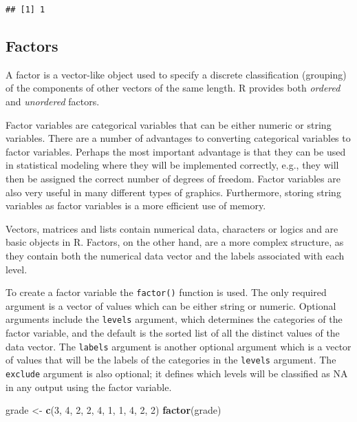 \documentclass[]{book}
\newenvironment{Shaded}{\begin{snugshade}}{\end{snugshade}}
\newcommand{\KeywordTok}[1]{\textcolor[rgb]{0.13,0.29,0.53}{\textbf{{#1}}}}
\newcommand{\DecValTok}[1]{\textcolor[rgb]{0.00,0.00,0.81}{{#1}}}
\newcommand{\StringTok}[1]{\textcolor[rgb]{0.31,0.60,0.02}{{#1}}}
\newcommand{\NormalTok}[1]{{#1}}
\begin{document}
\begin{verbatim}
## [1] 1
\end{verbatim}

\subsection{Factors}\label{factors}

A factor is a vector-like object used to specify a discrete
classification (grouping) of the components of other vectors of the same
length. R provides both \emph{ordered} and \emph{unordered} factors.

Factor variables are categorical variables that can be either numeric or
string variables. There are a number of advantages to converting
categorical variables to factor variables. Perhaps the most important
advantage is that they can be used in statistical modeling where they
will be implemented correctly, e.g., they will then be assigned the
correct number of degrees of freedom. Factor variables are also very
useful in many different types of graphics. Furthermore, storing string
variables as factor variables is a more efficient use of memory.

Vectors, matrices and lists contain numerical data, characters or logics
and are basic objects in R. Factors, on the other hand, are a more
complex structure, as they contain both the numerical data vector and
the labels associated with each level.

To create a factor variable the \texttt{factor()} function is used. The
only required argument is a vector of values which can be either string
or numeric. Optional arguments include the \texttt{levels} argument,
which determines the categories of the factor variable, and the default
is the sorted list of all the distinct values of the data vector. The
\texttt{labels} argument is another optional argument which is a vector
of values that will be the labels of the categories in the
\texttt{levels} argument. The \texttt{exclude} argument is also
optional; it defines which levels will be classified as NA in any output
using the factor variable.

\begin{Shaded}
\begin{Highlighting}[]
\NormalTok{grade <-}\StringTok{ }\KeywordTok{c}\NormalTok{(}\DecValTok{3}\NormalTok{, }\DecValTok{4}\NormalTok{, }\DecValTok{2}\NormalTok{, }\DecValTok{2}\NormalTok{, }\DecValTok{4}\NormalTok{, }\DecValTok{1}\NormalTok{, }\DecValTok{1}\NormalTok{, }\DecValTok{4}\NormalTok{, }\DecValTok{2}\NormalTok{, }\DecValTok{2}\NormalTok{)}
\KeywordTok{factor}\NormalTok{(grade)  }
\end{Highlighting}
\end{Shaded}
\end{document}
